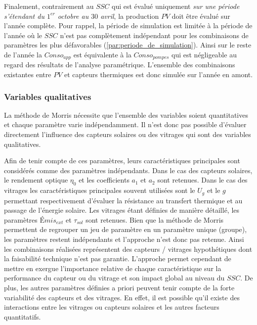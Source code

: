 Finalement, contrairement au $SSC$ qui est évalué uniquement \emph{sur une période
s’étendant du $1^{er}$ octobre au $30$ avril}, la production $PV$ doit être évalué sur
l’année complète. Pour rappel, la période de simulation est limitée à la période de
l’année où le $SSC$ n’est pas complètement indépendant pour les combinaisons de paramètres
les plus défavorables (\ref{par:periode_de_simulation}). Ainsi sur le reste de l’année la
$Conso_{app}$ est équivalente à la $Conso_{pompes}$ qui est négligeable au regard des
résultats de l’analyse paramétrique. L’ensemble des combinaisons existantes entre $PV$ et
capteurs thermiques est donc simulée sur l’année en amont.


\subsubsection{Variables qualitatives} %
\label{ssub:variables_qualitatives}
La méthode de Morris nécessite que l’ensemble des variables soient quantitatives et chaque
paramètre varie indépendamment. Il n’est donc pas possible d’évaluer directement
l’influence des capteurs solaires ou des vitrages qui sont des variables qualitatives.

Afin de tenir compte de ces paramètres, leurs caractéristiques principales sont considérés
comme des paramètres indépendants. Dans le cas des capteurs solaires, le rendement optique
$\eta_{0}$ et les coefficients $a_{1}$ et $a_{2}$ sont retenues. Dans le cas des vitrages
les caractéristiques principales souvent utilisées sont le $U_{g}$ et le $g$ permettant
respectivement d’évaluer la résistance au transfert thermique et au passage de l’énergie
solaire. Les vitrages étant définies de manière détaillé, les paramètres $Émis_{ext}$
et $\tau_{sol}$ sont retenues. Bien que la méthode de Morris permettent de
regrouper un jeu de paramètre en un paramètre unique (groupe), les paramètres restent
indépendants et l’approche n’est donc pas retenue. Ainsi les combinaisons réalisées
représentent des capteurs / vitrages hypothétiques dont la faisabilité technique n’est pas
garantie. L’approche permet cependant de mettre en exergue l’importance relative de chaque
caractéristique sur la performance du capteur ou du vitrage et son impact global au niveau
du $SSC$. De plus, les autres paramètres définies a priori peuvent tenir compte de la
forte variabilité des capteurs et des vitrages. En effet, il est possible qu’il existe des
interactions entre les vitrages ou capteurs solaires et les autres facteurs quantitatifs.

